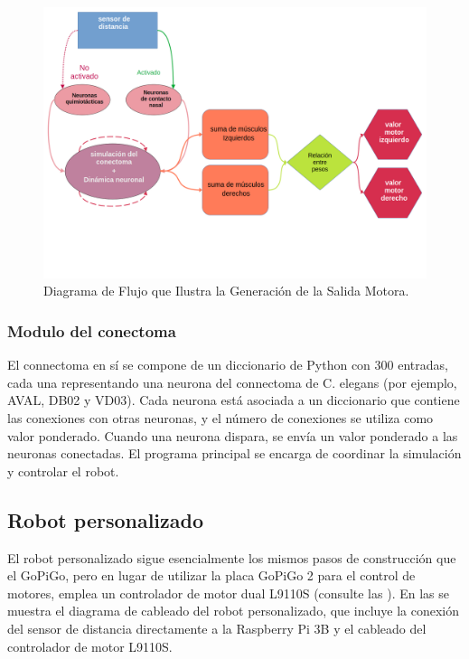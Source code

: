  
  \begin{figure}[h!]
 	\centering\includegraphics[width=\imsize]{robot_2.png}
 	\caption[Diagrama de Flujo que Ilustra la Generación de la Salida Motora.]{Diagrama de Flujo que Ilustra la Generación de la Salida Motora.}\label{fig:robot_2}
 \end{figure}
 

 
 
  \subsubsection{Modulo del conectoma}
 
El connectoma en sí se compone de un diccionario de Python con 300 entradas, cada una representando una neurona del connectoma de C. elegans (por ejemplo, AVAL, DB02 y VD03). Cada neurona está asociada a un diccionario que contiene las conexiones con otras neuronas, y el número de conexiones se utiliza como valor ponderado. Cuando una neurona dispara, se envía un valor ponderado a las neuronas conectadas. El programa principal se encarga de coordinar la simulación y controlar el robot.


 \subsection{Robot personalizado}

El robot personalizado sigue esencialmente los mismos pasos de construcción que el GoPiGo, pero en lugar de utilizar la placa GoPiGo 2 para el control de motores, emplea un controlador de motor dual L9110S (consulte las ). En las  se muestra el diagrama de cableado del robot personalizado, que incluye la conexión del sensor de distancia directamente a la Raspberry Pi 3B y el cableado del controlador de motor L9110S.


